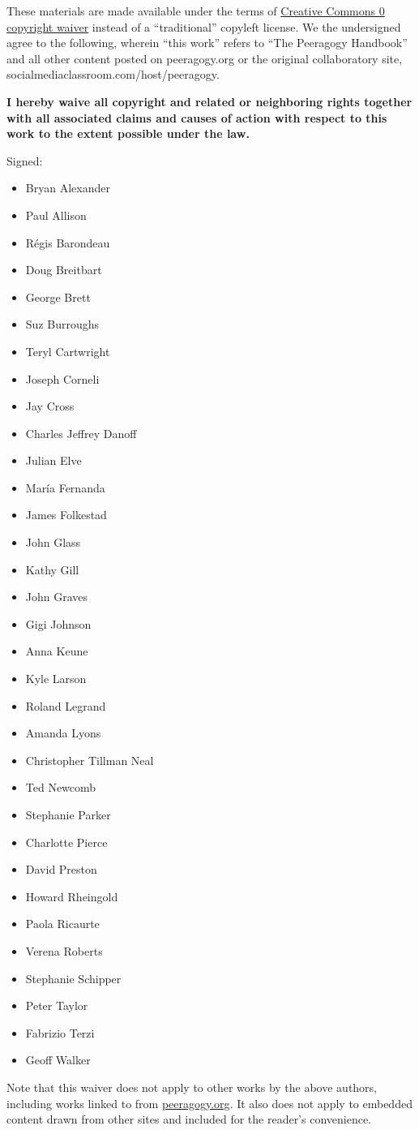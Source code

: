 These materials are made available under the terms of
\href{http://creativecommons.org/publicdomain/zero/1.0/}{Creative
Commons 0 copyright waiver} instead of a ``traditional'' copyleft
license. We the undersigned agree to the following, wherein ``this
work'' refers to ``The Peeragogy Handbook'' and all other content posted
on peeragogy.org or the original
collaboratory site, socialmediaclassroom.com/host/peeragogy.

\bigskip
\textbf{I hereby waive all copyright and related or neighboring rights
together with all associated claims and causes of action with respect to
this work to the extent possible under the law.}

\bigskip
Signed:

\begin{itemize}
\item
  Bryan Alexander
\item
  Paul Allison
\item
  Régis Barondeau
\item
  Doug Breitbart
\item
  George Brett
\item
  Suz Burroughs
\item
  Teryl Cartwright
\item
  Joseph Corneli
\item
  Jay Cross
\item
  Charles Jeffrey Danoff
\item
  Julian Elve
\item
  María Fernanda
\item
  James Folkestad
\item
  John Glass
\item
  Kathy Gill
\item
  John Graves
\item
  Gigi Johnson
\item
  Anna Keune
\item
  Kyle Larson
\item
  Roland Legrand
\item
  Amanda Lyons
\item
  Christopher Tillman Neal
\item
  Ted Newcomb
\item
  Stephanie Parker
\item
  Charlotte Pierce
\item
  David Preston
\item
  Howard Rheingold
\item
  Paola Ricaurte
\item
  Verena Roberts
\item
  Stephanie Schipper
\item
  Peter Taylor
\item
  Fabrizio Terzi
\item
  Geoff Walker
\end{itemize}
Note that this waiver does not apply to other works by the above
authors, including works linked to from
\href{http://peeragogy.org}{peeragogy.org}. It also does not apply to
embedded content drawn from other sites and included for the reader's
convenience.

